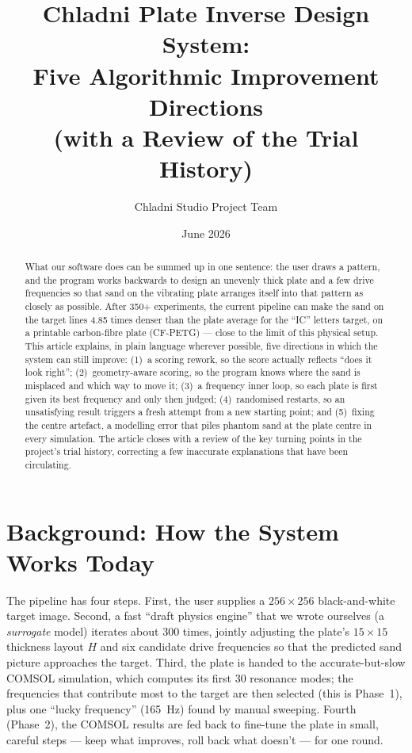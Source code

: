 \documentclass[11pt,a4paper]{article}
\title{\textbf{Chladni Plate Inverse Design System:\\Five Algorithmic Improvement Directions\\
\large (with a Review of the Trial History)}}
\author{Chladni Studio Project Team}
\date{June 2026}
\begin{document}
\maketitle

\begin{abstract}
What our software does can be summed up in one sentence: the user draws a pattern, and the program works backwards to design an unevenly thick plate and a few drive frequencies so that sand on the vibrating plate arranges itself into that pattern as closely as possible. After 350+ experiments, the current pipeline can make the sand on the target lines 4.85 times denser than the plate average for the ``IC'' letters target, on a printable carbon-fibre plate (CF-PETG) --- close to the limit of this physical setup. This article explains, in plain language wherever possible, five directions in which the system can still improve: (1)~a scoring rework, so the score actually reflects ``does it look right''; (2)~geometry-aware scoring, so the program knows where the sand is misplaced and which way to move it; (3)~a frequency inner loop, so each plate is first given its best frequency and only then judged; (4)~randomised restarts, so an unsatisfying result triggers a fresh attempt from a new starting point; and (5)~fixing the centre artefact, a modelling error that piles phantom sand at the plate centre in every simulation. The article closes with a review of the key turning points in the project's trial history, correcting a few inaccurate explanations that have been circulating.
\end{abstract}

\section{Background: How the System Works Today}

The pipeline has four steps. First, the user supplies a $256\times 256$ black-and-white target image. Second, a fast ``draft physics engine'' that we wrote ourselves (a \emph{surrogate} model) iterates about 300 times, jointly adjusting the plate's $15\times 15$ thickness layout $H$ and six candidate drive frequencies so that the predicted sand picture approaches the target. Third, the plate is handed to the accurate-but-slow COMSOL simulation, which computes its first 30 resonance modes; the frequencies that contribute most to the target are then selected (this is Phase~1), plus one ``lucky frequency'' (165~Hz) found by manual sweeping. Fourth (Phase~2), the COMSOL results are fed back to fine-tune the plate in small, careful steps --- keep what improves, roll back what doesn't --- for one round.
\end{document}
